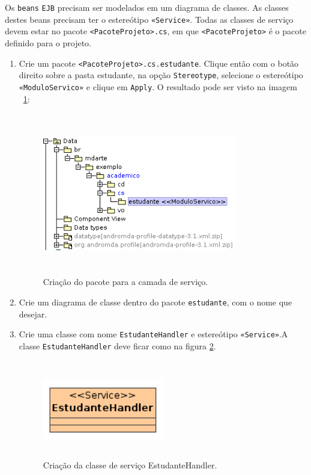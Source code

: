 Os \texttt{beans} \texttt{EJB} precisam ser modelados em um diagrama de classes.
As classes destes beans precisam ter o estereótipo \texttt{«Service»}. Todas as
classes de serviço devem estar no pacote \texttt{<PacoteProjeto>.cs}, em que
\texttt{<PacoteProjeto>} é o pacote definido para o projeto.

\begin{enumerate}
\item Crie um pacote \texttt{<PacoteProjeto>.cs.estudante}. Clique então com o
botão direito sobre a pasta estudante, na opção \texttt{Stereotype}, selecione o
estereótipo \texttt{«ModuloServico»} e clique em \texttt{Apply}. O resultado
pode ser visto na imagem ~\ref{cria_pacote_servico}:
 \begin{figure}[H]
	\centering
	\includegraphics[width=240pt,height=200pt]{imgs/tutorial-mdarte-0008.png}
	\caption{Criação do pacote para a camada de serviço.}
	\label{cria_pacote_servico}
\end{figure} 
	
\item Crie um diagrama de classe dentro do pacote \texttt{estudante}, com o nome
que desejar.
	
\item Crie uma classe com nome \texttt{EstudanteHandler} e estereótipo
\texttt{«Service»}.A classe \texttt{EstudanteHandler} deve ficar como na figura
\ref{cria_sevico_estudante}.
\begin{figure}[H]
	\centering
	\includegraphics[width=150pt,height=120pt]{imgs/tutorial-mdarte-0009.png}
	\caption{Criação da classe de serviço EstudanteHandler.}
	\label{cria_sevico_estudante}
\end{figure} 
	

\end{enumerate}
